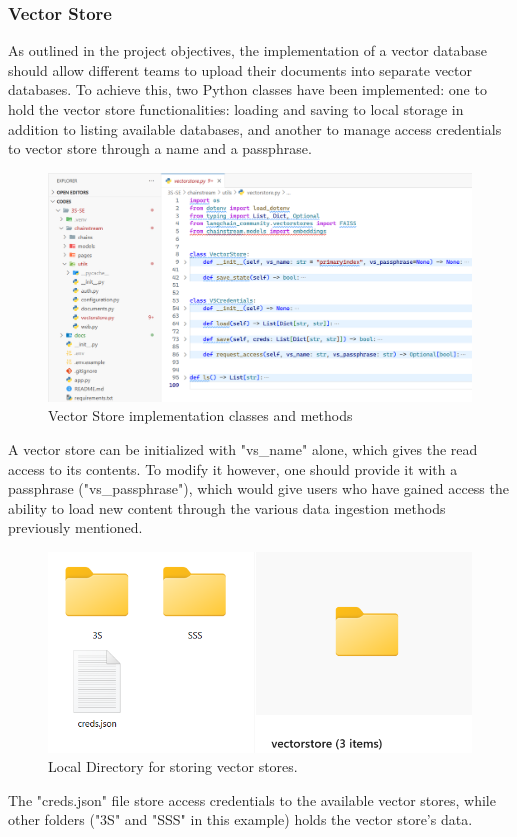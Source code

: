\subsubsection{Vector Store}
As outlined in the project objectives, the implementation of a vector database should allow different teams to upload their documents into separate vector databases.\newline
To achieve this, two Python classes have been implemented: one to hold the vector store functionalities: loading and saving to local storage in addition to listing available databases, and another to manage access credentials to vector store through a name and a passphrase.
\begin{figure}[H]
    \centering
    \includegraphics[width=\linewidth]{./figures/vectorstore-implementation.png}
    \caption{Vector Store implementation classes and methods}
\end{figure}
A vector store can be initialized with "vs\_name" alone, which gives the read access to its contents. To modify it however, one should provide it with a passphrase ("vs\_passphrase"), which would give users who have gained access the ability to load new content through the various data ingestion methods previously mentioned.
\begin{figure}[H]
    \centering
    \includegraphics[width=.8\linewidth]{./figures/vectorstore-local-dir.png}
    \caption{Local Directory for storing vector stores.}
\end{figure}
The "creds.json" file store access credentials to the available vector stores, while other folders ("3S" and "SSS" in this example) holds the vector store's data.
